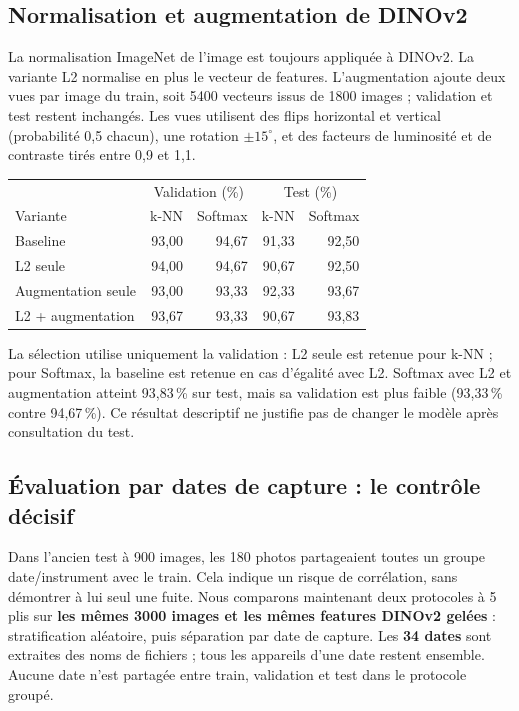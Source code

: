 \documentclass[10pt,a4paper]{article}
\newcommand{\pct}{\,\%\xspace}
\begin{document}
\subsection{Normalisation et augmentation de DINOv2}
La normalisation ImageNet de l'image est toujours appliquée à DINOv2. La variante L2
normalise en plus le vecteur de features. L'augmentation ajoute deux vues par image du train,
soit 5400 vecteurs issus de 1800 images ; validation et test restent inchangés. Les vues utilisent
des flips horizontal et vertical (probabilité 0,5 chacun), une rotation $\pm15^\circ$, et
des facteurs de luminosité et de contraste tirés entre 0,9 et 1,1.
\begin{center}\small
\begin{tabular}{lrrrr}\toprule
 & \multicolumn{2}{c}{Validation (\%)} & \multicolumn{2}{c}{Test (\%)}\\
Variante & k-NN & Softmax & k-NN & Softmax\\\midrule
Baseline & 93,00 & 94,67 & 91,33 & 92,50\\
L2 seule & 94,00 & 94,67 & 90,67 & 92,50\\
Augmentation seule & 93,00 & 93,33 & 92,33 & 93,67\\
L2 + augmentation & 93,67 & 93,33 & 90,67 & 93,83\\\bottomrule\end{tabular}
\end{center}
La sélection utilise uniquement la validation : L2 seule est retenue pour k-NN ; pour Softmax,
la baseline est retenue en cas d'égalité avec L2. Softmax avec L2 et augmentation atteint
93,83\pct sur test, mais sa validation est plus faible (93,33\pct contre 94,67\pct).
Ce résultat descriptif ne justifie pas de changer le modèle après consultation du test.

\clearpage
\subsection{Évaluation par dates de capture : le contrôle décisif}
Dans l'ancien test à 900 images, les 180 photos partageaient toutes un groupe date/instrument
avec le train. Cela indique un risque de corrélation, sans démontrer à lui seul une fuite.
Nous comparons maintenant deux protocoles à 5 plis sur \textbf{les mêmes 3000 images et les mêmes
features DINOv2 gelées} : stratification aléatoire, puis séparation par date de capture.
Les \textbf{34 dates} sont extraites des noms de fichiers ; tous les appareils d'une date restent
ensemble. Aucune date n'est partagée entre train, validation et test dans le protocole groupé.
\end{document}
